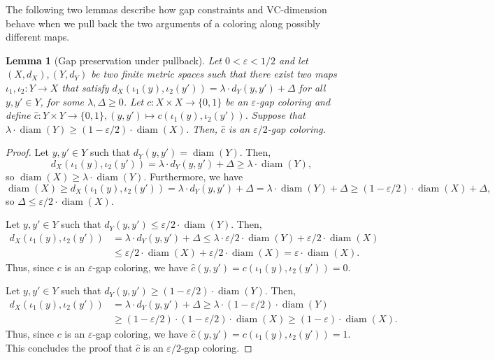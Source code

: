\documentclass[10pt,a4paper]{amsart}
\DeclareMathOperator{\diam}{diam}
\newtheorem{lemma}[theorem]{Lemma}
\begin{document}
The following two lemmas describe how gap constraints and VC-dimension behave when we pull back the two arguments of a coloring along possibly different maps.

\begin{lemma}[Gap preservation under pullback]\label{lem:transfer-gap-coloring}
    Let $0 < \varepsilon < 1/2$ and let $(X, d_X), (Y, d_Y)$ be two finite metric spaces such that there exist two maps $\iota_1, \iota_2 : Y \to X$ that satisfy $d_X(\iota_1(y), \iota_2(y')) = \lambda \cdot d_Y(y, y') + \Delta$ for all $y, y' \in Y$, for some $\lambda, \Delta \geq 0$.
    Let $c : X \times X \to \{0, 1\}$ be an $\varepsilon$-gap coloring and define $\widehat{c} : Y \times Y \to \{0, 1\}, (y, y') \mapsto c(\iota_1(y), \iota_2(y'))$.
    Suppose that $\lambda \cdot \diam(Y) \geq (1-\varepsilon/2) \cdot \diam(X)$.
    Then, $\widehat{c}$ is an $\varepsilon/2$-gap coloring.
\end{lemma}

\begin{proof}
    Let $y, y' \in Y$ such that $d_Y(y, y') = \diam(Y)$.
    Then, \[d_X(\iota_1(y), \iota_2(y')) = \lambda \cdot d_Y(y, y') + \Delta \geq \lambda \cdot \diam(Y),\] so $\diam(X) \geq \lambda \cdot \diam(Y)$.
    Furthermore, we have \[\diam(X) \geq d_X(\iota_1(y), \iota_2(y')) = \lambda \cdot d_Y(y, y') + \Delta = \lambda \cdot \diam(Y) + \Delta \geq (1-\varepsilon/2) \cdot \diam(X) + \Delta,\] so $\Delta \leq \varepsilon/2 \cdot \diam(X)$.

    Let $y, y' \in Y$ such that $d_Y(y, y') \leq \varepsilon/2 \cdot \diam(Y)$.
    Then, \begin{align*}
        d_X(\iota_1(y), \iota_2(y')) &= \lambda \cdot d_Y(y, y') + \Delta \leq \lambda \cdot \varepsilon/2 \cdot \diam(Y) + \varepsilon/2 \cdot \diam(X) \\
        &\leq \varepsilon/2 \cdot \diam(X) + \varepsilon/2 \cdot \diam(X) = \varepsilon \cdot \diam(X).
    \end{align*} Thus, since $c$ is an $\varepsilon$-gap coloring, we have $\widehat{c}(y, y') = c(\iota_1(y), \iota_2(y')) = 0$.
    \smallskip
    
    Let $y, y' \in Y$ such that $d_Y(y, y') \geq (1-\varepsilon/2) \cdot \diam(Y)$.
    Then, \begin{align*}
        d_X(\iota_1(y), \iota_2(y')) &= \lambda \cdot d_Y(y, y') + \Delta \geq \lambda \cdot (1-\varepsilon/2) \cdot \diam(Y) \\
        &\geq (1-\varepsilon/2) \cdot (1-\varepsilon/2) \cdot \diam(X) \geq (1 - \varepsilon) \cdot \diam(X).
    \end{align*} 
    Thus, since $c$ is an $\varepsilon$-gap coloring, we have $\widehat{c}(y, y') = c(\iota_1(y), \iota_2(y')) = 1$.
    This concludes the proof that $\widehat{c}$ is an $\varepsilon/2$-gap coloring.
\end{proof}
\end{document}
